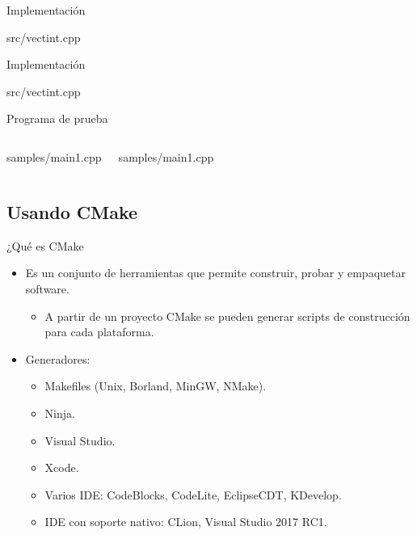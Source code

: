 \begin{frame}[t]{Implementación}
\begin{block}{src/vectint.cpp}

\end{block}
\end{frame}

\begin{frame}[t]{Implementación}
\begin{block}{src/vectint.cpp}

\end{block}
\end{frame}

\begin{frame}[t]{Programa de prueba}
\begin{columns}[T]

\begin{block}{samples/main1.cpp}

\end{block}

\begin{block}{samples/main1.cpp}

\end{block}

\end{columns}
\end{frame}

\subsection{Usando CMake}

\begin{frame}[t]{¿Qué es CMake}
\begin{itemize}
  \item Es un conjunto de herramientas que permite construir, probar
        y empaquetar software.
  
    \begin{itemize}
      \item A partir de un proyecto CMake se pueden generar scripts de
            construcción para cada plataforma.
    \end{itemize}

  \item Generadores:
    \begin{itemize}
      \item Makefiles (Unix, Borland, MinGW, NMake).
      \item Ninja.
      \item Visual Studio.
      \item Xcode.
      \item Varios IDE:  CodeBlocks, CodeLite, EclipseCDT, KDevelop.
      \item IDE con soporte nativo: CLion, Visual Studio 2017 RC1.
    \end{itemize}
\end{itemize}
\end{frame}

